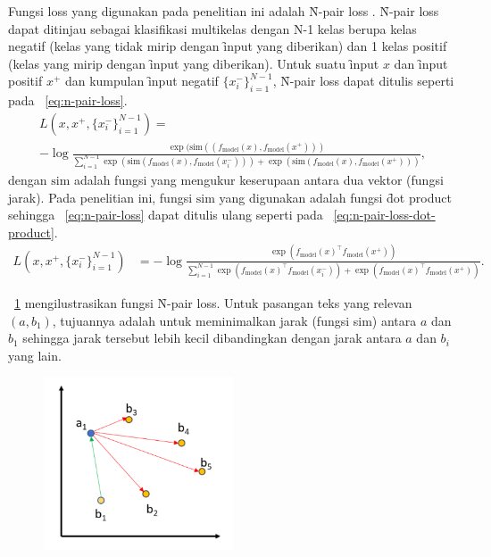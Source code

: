 Fungsi loss yang digunakan pada penelitian ini adalah \f{N-pair loss} \citep{InfoNCE}. \f{N-pair loss} dapat ditinjau sebagai klasifikasi multikelas dengan N-1 kelas berupa kelas negatif (kelas yang tidak mirip dengan \f{input} yang diberikan) dan 1 kelas positif (kelas yang mirip dengan \f{input} yang diberikan). Untuk suatu \f{input} $x$ dan \f{input} positif $x^+$ dan kumpulan \f{input} negatif $\{x^-_i\}_{i=1}^{N-1}$, \f{N-pair loss} dapat ditulis seperti pada \equ~\ref{eq:n-pair-loss}.
\begin{align}
\label{eq:n-pair-loss}
\nonumber
 L(x, x^+, \{x^-_i\}_{i=1}^{N-1}) = \\
 -\log\frac{\exp(\text{sim}((f_\text{model}(x), f_\text{model}(x^+)))}{\sum_{i=1}^{N-1} \exp(\text{sim}(f_\text{model}(x), f_\text{model}(x^-_i)))+\exp(\text{sim}(f_\text{model}(x), f_\text{model}(x^+)))},
\end{align}
dengan $\text{sim}$ adalah fungsi yang mengukur keserupaan antara dua vektor (fungsi jarak). Pada penelitian ini, fungsi $\text{sim}$ yang digunakan adalah fungsi \f{dot product} sehingga \equ~\ref{eq:n-pair-loss} dapat ditulis ulang seperti pada \equ~\ref{eq:n-pair-loss-dot-product}.
\begin{align}
\label{eq:n-pair-loss-dot-product}
 L(x, x^+, \{x^-_i\}_{i=1}^{N-1}) &= -\log\frac{\exp(f_\text{model}(x)^{\top}f_\text{model}(x^+))}{\sum_{i=1}^{N-1} \exp(f_\text{model}(x)^{\top}f_\text{model}(x^-_i))+\exp(f_\text{model}(x)^{\top}f_\text{model}(x^+))}.
\end{align}

\pic~\ref{fig:n-pair-loss} mengilustrasikan fungsi \f{N-pair loss}. Untuk pasangan teks yang relevan $(a, b_1)$, tujuannya adalah untuk meminimalkan jarak (fungsi sim) antara $a$ dan $b_1$ sehingga jarak tersebut lebih kecil dibandingkan dengan jarak antara $a$ dan $b_i$ yang lain.
\begin{figure}
    \centering
    \includegraphics[width=0.5\textwidth]{assets/pics/InfoNCE.png}
    \label{fig:n-pair-loss}
\end{figure}

















        

